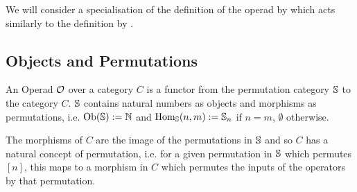 \begin{Remark}
We will consider a specialisation of the definition of the operad by \cite{merkulov2021grothendieckteichmuellergroupoperadsgraph} which acts similarly to the definition by \cite{spivak2013categorytheoryscientistsold}. 
\end{Remark}




\subsection{Objects and Permutations}
An Operad \( \mathcal{O} \) over a category \( C \) is a functor from the permutation category \( \mathbb{S} \) to the category \( C \). 
\( \mathbb{S} \) contains natural numbers as objects and morphisms as permutations, i.e. \( \operatorname{\text{Ob}}(\mathbb{S}) := \mathbb{N} \) and \( \operatorname{Hom}_{\mathbb{S}}(n, m) := \mathbb{S}_n \) if \( n = m \), \( \emptyset \) otherwise. 

The morphisms of \( C \) are the image of the permutations in \( \mathbb{S} \) and so \( C \) has a natural concept of permutation, i.e. for a given permutation in \( \mathbb{S} \) which permutes \( [n] \), this maps to a morphism in \( C \) which permutes the inputs of the operators by that permutation. 

